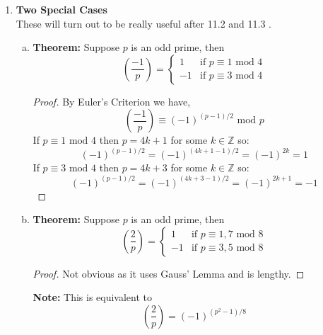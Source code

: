 \documentclass[class=article, crop=false]{standalone}
\def\integers{{\mathbb Z}}
\begin{document}
\begin{enumerate}[1.]
\begin{enumerate}[(a)]
\begin{enumerate}
		\item $\left(\frac{a^2}{p}\right) = 1$
		\begin{proof}
			Obvious.
		\end{proof}
	\end{enumerate}

	\item \textbf{Gauss' Lemma:} Suppose $p$ is an odd prime and $a\in\integers$ with $\gcd(a,p)=1$.
	Let $s$ be the number of least nonnegative residues in the set
	$\left\{a,2a,\cdots, \left((p-1)/2\right)a\right\}$ which are $> p/2$.
	Then $\left(\frac{a}{p}\right) = (-1)^s$. \\\\
	\textbf{Ex.} Consider $\left(\frac{8}{13}\right)$. Note that $\left(\frac{p-1}{2}\right) = \frac{12}{2} = 6$
	so look at 
	$$\{8, 2\cdot8, 3\cdot8, \cdots, 6\cdot8\} \equiv \{8,3,11,6,1,9\} \mbox{ mod } 13$$
	Since only three of these are greater than $p/2 = 6.5$ we have $\left(\frac{8}{13}\right) = (-1)^3 = -1$. Thus,
	8 is a quadratic nonresidue mod 13.
\end{enumerate}

	\item \textbf{Two Special Cases}\\
	These will turn out to be really useful after 11.2 and 11.3 .
	\begin{enumerate}[(a)]
		\item \textbf{Theorem:} Suppose $p$ is an odd prime, then
		$$\left(\frac{-1}{p}\right) = \begin{cases}
			1 &\text{if $p\equiv 1\mbox{ mod } 4$} \\
			-1 &\text{if $p\equiv 3\mbox{ mod } 4$}
		\end{cases}$$
		\begin{proof}
			By Euler's Criterion we have,
			$$\left(\frac{-1}{p}\right) \equiv (-1)^{(p-1)/2} \mbox{ mod }p$$
			If $p\equiv 1\mbox{ mod }4$ then $p=4k+1$ for some $k\in\integers$ so:
			$$(-1)^{(p-1)/2} = (-1)^{(4k+1-1)/2} = (-1)^{2k} = 1$$
			If $p\equiv 3\mbox{ mod }4$ then $p=4k+3$ for some $k\in\integers$ so:
			$$(-1)^{(p-1)/2} = (-1)^{(4k+3-1)/2} = (-1)^{2k+1} = -1$$
		\end{proof}

		\item \textbf{Theorem:} Suppose $p$ is an odd prime, then
		$$\left(\frac{2}{p}\right) = \begin{cases}
			1 &\text{if $p\equiv 1,7\mbox{ mod } 8$} \\
			-1 &\text{if $p\equiv 3,5\mbox{ mod } 8$}
		\end{cases}$$
		\begin{proof}
			Not obvious as it uses Gauss' Lemma and is lengthy.
		\end{proof}
		\noindent\textbf{Note:} This is equivalent to
		$$\left(\frac{2}{p}\right) = (-1)^{(p^2 - 1)/8}$$
	\end{enumerate}
\end{enumerate}

\end{document}
